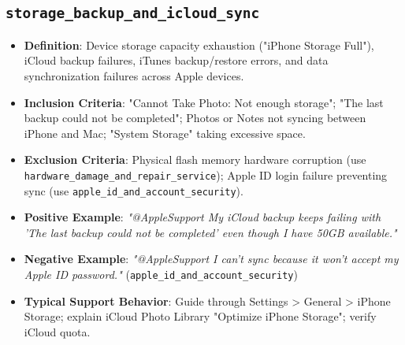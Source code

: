 \documentclass[11pt,a4paper]{article}
\begin{document}
\subsection{\texttt{storage\_backup\_and\_icloud\_sync}}
\begin{itemize}[leftmargin=*]
    \item \textbf{Definition}: Device storage capacity exhaustion ("iPhone Storage Full"), iCloud backup failures, iTunes backup/restore errors, and data synchronization failures across Apple devices.
    \item \textbf{Inclusion Criteria}: "Cannot Take Photo: Not enough storage"; "The last backup could not be completed"; Photos or Notes not syncing between iPhone and Mac; "System Storage" taking excessive space.
    \item \textbf{Exclusion Criteria}: Physical flash memory hardware corruption (use \texttt{hardware\_damage\_and\_repair\_service}); Apple ID login failure preventing sync (use \texttt{apple\_id\_and\_account\_security}).
    \item \textbf{Positive Example}: \textit{"@AppleSupport My iCloud backup keeps failing with 'The last backup could not be completed' even though I have 50GB available."}
    \item \textbf{Negative Example}: \textit{"@AppleSupport I can't sync because it won't accept my Apple ID password."} (\texttt{apple\_id\_and\_account\_security})
    \item \textbf{Typical Support Behavior}: Guide through Settings > General > iPhone Storage; explain iCloud Photo Library "Optimize iPhone Storage"; verify iCloud quota.
\end{itemize}
\end{document}
